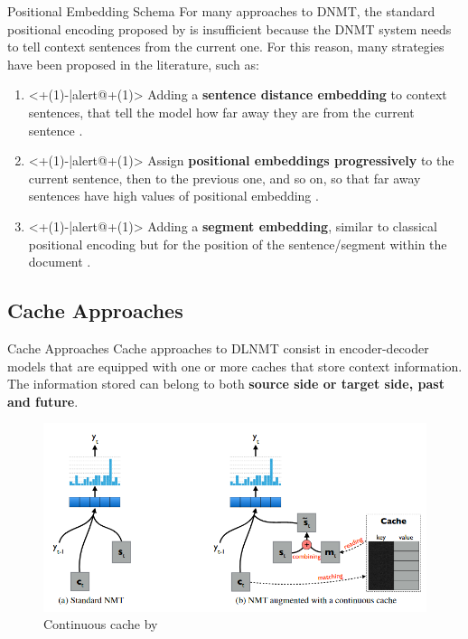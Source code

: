 \begin{frame}{Positional Embedding Schema}
	For many approaches to DNMT, the standard positional encoding proposed by \cite{vaswani_attention_2017} is insufficient because the DNMT system needs to tell context sentences from the current one. For this reason, many strategies have been proposed in the literature, such as:
	\begin{enumerate}
		\item<+(1)-|alert@+(1)> Adding a \textbf{sentence distance embedding} to context sentences, that tell the model how far away they are from the current sentence \cite{voita_when_2019}.
		\item<+(1)-|alert@+(1)> Assign \textbf{positional embeddings progressively} to the current sentence, then to the previous one, and so on, so that far away sentences have high values of positional embedding \cite{booo}.
		\item<+(1)-|alert@+(1)> Adding a \textbf{segment embedding}, similar to classical positional encoding but for the position of the sentence/segment within the document  \cite{zheng_toward_2020}.
	\end{enumerate}
\end{frame}

\subsection{Cache Approaches}

\begin{frame}{Cache Approaches}
	Cache approaches to DLNMT consist in encoder-decoder models that are equipped with one or more caches that store context information.
	The information stored can belong to both \textbf{source side or target side, past and future}. 

	\begin{figure}
		\centering
		\includegraphics[width=0.7\linewidth]{Images/cache}
		\caption{Continuous cache by \cite{tu_learning_2017}}
		\label{fig:cache}
	\end{figure} 
\end{frame}

